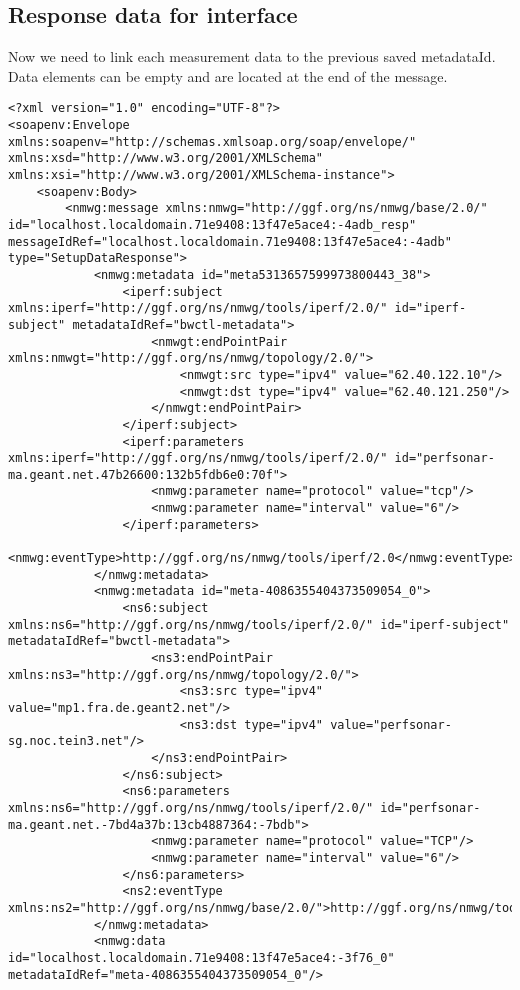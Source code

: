 \documentclass[a4paper,12pt,titlepage,hidelinks,fleqn]{article}
\begin{document}
\subsection{Response data for interface}
\begin{flushleft}
Now we need to link each measurement data to the previous saved metadataId. Data elements can be empty and are located at the end of the message.
\begin{framed}
\begin{lstlisting}
<?xml version="1.0" encoding="UTF-8"?>
<soapenv:Envelope xmlns:soapenv="http://schemas.xmlsoap.org/soap/envelope/" xmlns:xsd="http://www.w3.org/2001/XMLSchema" xmlns:xsi="http://www.w3.org/2001/XMLSchema-instance">
	<soapenv:Body>
		<nmwg:message xmlns:nmwg="http://ggf.org/ns/nmwg/base/2.0/" id="localhost.localdomain.71e9408:13f47e5ace4:-4adb_resp" messageIdRef="localhost.localdomain.71e9408:13f47e5ace4:-4adb" type="SetupDataResponse">
			<nmwg:metadata id="meta5313657599973800443_38">
				<iperf:subject xmlns:iperf="http://ggf.org/ns/nmwg/tools/iperf/2.0/" id="iperf-subject" metadataIdRef="bwctl-metadata">
					<nmwgt:endPointPair xmlns:nmwgt="http://ggf.org/ns/nmwg/topology/2.0/">
						<nmwgt:src type="ipv4" value="62.40.122.10"/>
						<nmwgt:dst type="ipv4" value="62.40.121.250"/>
					</nmwgt:endPointPair>
				</iperf:subject>
				<iperf:parameters xmlns:iperf="http://ggf.org/ns/nmwg/tools/iperf/2.0/" id="perfsonar-ma.geant.net.47b26600:132b5fdb6e0:70f">
					<nmwg:parameter name="protocol" value="tcp"/>
					<nmwg:parameter name="interval" value="6"/>
				</iperf:parameters>
				<nmwg:eventType>http://ggf.org/ns/nmwg/tools/iperf/2.0</nmwg:eventType>
			</nmwg:metadata>		
			<nmwg:metadata id="meta-4086355404373509054_0">
				<ns6:subject xmlns:ns6="http://ggf.org/ns/nmwg/tools/iperf/2.0/" id="iperf-subject" metadataIdRef="bwctl-metadata">
					<ns3:endPointPair xmlns:ns3="http://ggf.org/ns/nmwg/topology/2.0/">
						<ns3:src type="ipv4" value="mp1.fra.de.geant2.net"/>
						<ns3:dst type="ipv4" value="perfsonar-sg.noc.tein3.net"/>
					</ns3:endPointPair>
				</ns6:subject>
				<ns6:parameters xmlns:ns6="http://ggf.org/ns/nmwg/tools/iperf/2.0/" id="perfsonar-ma.geant.net.-7bd4a37b:13cb4887364:-7bdb">
					<nmwg:parameter name="protocol" value="TCP"/>
					<nmwg:parameter name="interval" value="6"/>
				</ns6:parameters>
				<ns2:eventType xmlns:ns2="http://ggf.org/ns/nmwg/base/2.0/">http://ggf.org/ns/nmwg/tools/iperf/2.0</ns2:eventType>
			</nmwg:metadata>
			<nmwg:data id="localhost.localdomain.71e9408:13f47e5ace4:-3f76_0" metadataIdRef="meta-4086355404373509054_0"/>

\end{lstlisting}
\end{framed}
\end{flushleft}
\end{document}
